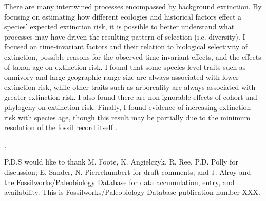\documentclass[12pt]{article}
\newcounter{lastnote}
\newenvironment{scilastnote}{%
\setcounter{lastnote}{\value{enumiv}}%
\addtocounter{lastnote}{+1}%
\begin{list}%
{\arabic{lastnote}.}
{\setlength{\leftmargin}{.22in}}
{\setlength{\labelsep}{.5em}}}
{\end{list}}
\begin{document}
There are many intertwined processes encompassed by background extinction. By focusing on estimating how different ecologies and historical factors effect a species' expected extinction risk, it is possible to better understand what processes may have driven the resulting pattern of selection (i.e. diversity). I focused on time-invariant factors and their relation to biological selectivity of extinction, possible reasons for the observed time-invariant effects, and the effects of taxon-age on extinction risk. I found that some species-level traits such as omnivory and large geographic range size are always associated with lower extinction risk, while other traits such as arboreality are always associated with greater extinction risk. I also found there are non-ignorable effects of cohort and phylogeny on extinction risk. Finally, I found evidence of increasing extinction risk with species age, though this result may be partially due to the minimum resolution of the fossil record itself \cite{Sepkoski1975}.





\begin{scilastnote}
\item P.D.S would like to thank M. Foote, K. Angielczyk, R. Ree, P.D. Polly for discussion; E. Sander, N. Pierrehumbert for draft comments; and J. Alroy and the Fossilworks/Paleobiology Database for data accumulation, entry, and availability. This is Fossilworks/Paleobiology Database publication number XXX.
\end{scilastnote}


\end{document}
